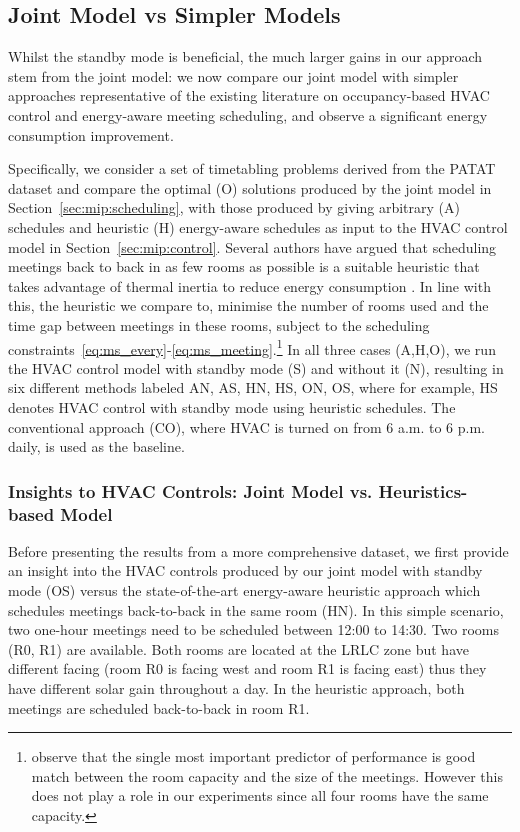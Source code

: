 \subsection{Joint Model vs Simpler Models}
\label{subsec:experiments:integration}

Whilst the standby mode is beneficial, the much larger gains in our approach stem from the joint model: we now compare our joint model with simpler approaches representative of the existing literature on occupancy-based HVAC control and energy-aware meeting scheduling, and observe a significant energy consumption improvement.

Specifically, we consider a set of timetabling problems derived from the PATAT \cite{patat02} dataset 
and compare the optimal (O) solutions produced by the joint model in Section~\ref{sec:mip:scheduling}, with those produced by giving arbitrary (A) schedules and heuristic (H) energy-aware schedules as input to the HVAC control model in Section~\ref{sec:mip:control}.  Several authors have argued that scheduling meetings back to back in as few rooms as possible is a suitable heuristic that takes advantage of thermal inertia to reduce energy consumption \citep{kwak2013tesla,majumdar2012energy,pan2012thermal}. In line with this, the heuristic we compare to, minimise the number of rooms used and the time gap between meetings in these rooms, subject to the scheduling constraints~\ref{eq:ms_every}-\ref{eq:ms_meeting}.\footnote{\cite{majumdar2012energy} observe that the single most important predictor of performance is good match between the room capacity and the size of the meetings. However this does not play a role in our experiments since all four rooms have the same capacity.} In all three cases (A,H,O), we run the HVAC control model with standby mode (S) and without it (N), resulting in six different methods labeled AN, AS, HN, HS, ON, OS, where for example, HS denotes HVAC control with standby mode using heuristic schedules. The conventional approach (CO), where HVAC is turned on from 6 a.m. to 6 p.m. daily, is used as the baseline.

\subsubsection{Insights to HVAC Controls: Joint Model vs. Heuristics-based Model}
Before presenting the results from a more comprehensive dataset, we first provide an insight into the HVAC controls produced by our joint model with standby mode (OS) versus the state-of-the-art energy-aware heuristic approach which schedules meetings back-to-back in the same room (HN). In this simple scenario, two one-hour meetings need to be scheduled between 12:00 to 14:30. Two rooms (R0, R1) are available. Both rooms are located at the LRLC zone but have different facing (room R0 is facing west and room R1 is facing east) thus they have different solar gain throughout a day. In the heuristic approach, both meetings are scheduled back-to-back in room R1.

